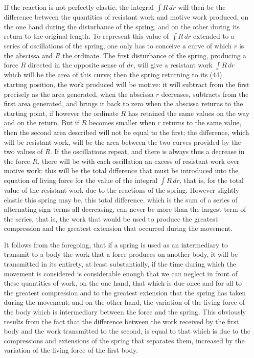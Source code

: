 \documentclass{book}
\begin{document}
If the reaction is not perfectly elastic, the integral \( \int R \, dr \) will then be the difference between the quantities of resistant work and motive work produced, on the one hand during the disturbance of the spring, and on the other during its return to the original length. To represent this value of \( \int R \, dr \) extended to a series of oscillations of the spring, one only has to conceive a curve of which \( r \) is the abscissa and \( R \) the ordinate. The first disturbance of the spring, producing a force \( R \) directed in the opposite sense of \( dr \), will give a resistant work \( \int R \, dr \) which will be the area of this curve; then the spring returning to its 
\newpage
(44) \\
starting position, the work produced will be motive: it will subtract from the first precisely as the area generated, when the abscissa \( r \) decreases, subtracts from the first area generated, and brings it back to zero when the abscissa returns to the starting point, if however the ordinate \( R \) has retained the same values on the way and on the return.
But if \( R \) becomes smaller when \( r \) returns to the same value, then the second area described will not be equal to the first; the difference, which will be resistant work, will be the area between the two curves provided by the two values of \( R \). If the oscillations repeat, and there is always thus a decrease in the force \( R \), there will be with each oscillation an excess of resistant work over motive work: this will be the total difference that must be introduced into the equation of living force for the value of the integral \( \int R \, dr \), that is, for the total value of the resistant work due to the reactions of the spring. However slightly elastic this spring may be, this total difference, which is the sum of a series of alternating sign terms all decreasing, can never be more than the largest term of the series, that is, the work that would be used to produce the greatest compression and the greatest extension that occurred during the movement.

It follows from the foregoing, that if a spring is used as an intermediary to transmit to a body the work that a force produces on another body, it will be transmitted in its entirety, at least substantially, if the time during which the movement is considered is considerable enough that we can neglect in front of these quantities of work, on the one hand, that which is due once and for all to the greatest compression and to the greatest extension that the spring has taken during the movement; and on the other hand, the variation of the living force of the body which is intermediary between the force and the spring. This obviously results from the fact that the difference between the work received by the first body and the work transmitted to the second, is equal to that which is due to the compressions and extensions of the spring that separates them, increased by the variation of the living force of the first body.
\end{document}
